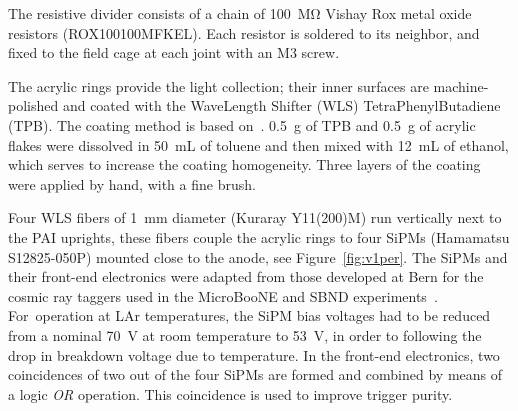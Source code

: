 \documentclass[instruments,article,accept,moreauthors,pdftex]{Definitions/mdpi}
\begin{document}
The resistive divider consists of a chain of \SI{100}{\mega\ohm} Vishay Rox metal oxide resistors (ROX100100MFKEL). 
Each resistor is soldered to its neighbor, and fixed to the field cage at each joint with an M3 screw.   

The acrylic rings provide the light collection; their inner surfaces are machine-polished and coated with the WaveLength Shifter (WLS) TetraPhenylButadiene (TPB). 
The coating method is based on~\cite{TPBcoating}.
\SI{0.5}{\gram} of TPB and \SI{0.5}{\gram} of acrylic flakes were dissolved in \SI{50}{\milli\liter} of toluene and then mixed with \SI{12}{\milli\liter} of ethanol, which serves to increase the coating homogeneity. 
Three layers of the coating were applied by hand, with a fine brush. 

Four WLS fibers of \SI{1}{\milli\metre} diameter (Kuraray Y11(200)M) run vertically next to the PAI uprights, these fibers couple the acrylic rings to four SiPMs (Hamamatsu S12825-050P) mounted close to the anode, see Figure~\ref{fig:v1per}. 
The SiPMs and their front-end electronics were adapted from those developed at Bern for the cosmic ray taggers used in the MicroBooNE and SBND experiments~\cite{CRT, CRT2}.
For~operation at LAr temperatures, the SiPM bias voltages had to be reduced from a nominal \SI{70}{\volt} at room temperature to \SI{53}{\volt}, in order to following the drop in breakdown voltage due to temperature.   
In the front-end electronics, two coincidences of two out of the four SiPMs are formed and combined by means of a logic \textit{OR} operation. 
This coincidence is used to improve trigger purity.
\end{document}
